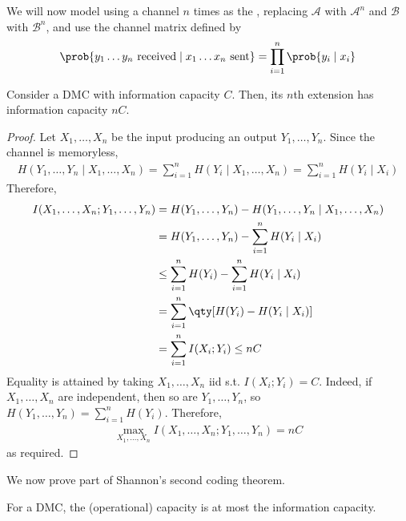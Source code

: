 We will now model using a channel $n$ times as the , replacing $\mathcal A$ with $\mathcal A^n$ and $\mathcal B$ with $\mathcal B^n$, and use the channel matrix defined by
\begin{align*}
    \prob{y_1 \dots y_n \text{ received} \mid x_1 \dots x_n \text{ sent}} = \prod_{i=1}^n \prob{y_i \mid x_i}
\end{align*}

\begin{lemma}
    Consider a DMC with information capacity $C$.
    Then, its $n$th extension has information capacity $nC$.
\end{lemma}

\begin{proof}
    Let $X_1, \dots, X_n$ be the input producing an output $Y_1, \dots, Y_n$.
    Since the channel is memoryless,
    \begin{align*}
        H(Y_1, \dots, Y_n \mid X_1, \dots, X_n) = \sum_{i=1}^n H(Y_i \mid X_1, \dots, X_n) = \sum_{i=1}^n H(Y_i \mid X_i)
    \end{align*}
    Therefore,
    \begin{align*}
        I(X_1, \dots, X_n; Y_1, \dots, Y_n) &= H(Y_1, \dots, Y_n) - H(Y_1, \dots, Y_n \mid X_1, \dots, X_n) \\
        &= H(Y_1, \dots, Y_n) - \sum_{i=1}^n H(Y_i \mid X_i) \\
        &\leq \sum_{i=1}^n H(Y_i) - \sum_{i=1}^n H(Y_i \mid X_i) \\
        &= \sum_{i=1}^n \qty[H(Y_i) - H(Y_i \mid X_i)] \\
        &= \sum_{i=1}^n I(X_i;Y_i) \leq nC
    \end{align*}
    Equality is attained by taking $X_1, \dots, X_n$ iid s.t. $I(X_i;Y_i) = C$.
    Indeed, if $X_1, \dots, X_n$ are independent, then so are $Y_1, \dots, Y_n$, so $H(Y_1, \dots, Y_n) = \sum_{i=1}^n H(Y_i)$.
    Therefore,
    \begin{align*}
        \max_{X_1, \dots, X_n} I(X_1, \dots, X_n; Y_1, \dots, Y_n) = nC
    \end{align*}
    as required.
\end{proof}

We now prove part of Shannon's second coding theorem.

\begin{proposition}
    For a DMC, the (operational) capacity is at most the information capacity.
\end{proposition}

